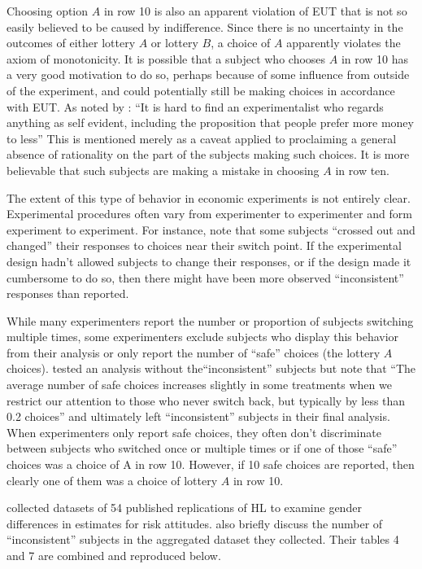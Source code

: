 \documentclass[../main.tex]{subfiles}
\begin{document}
Choosing option $A$ in row 10 is also an apparent violation of EUT that is not so easily believed to be caused by indifference.
Since there is no uncertainty in the outcomes of either lottery $A$ or lottery $B$, a choice of $A$ apparently violates the axiom of monotonicity.
It is possible that a subject who chooses $A$ in row 10 has a very good motivation to do so, perhaps because of some influence from outside of the experiment, and could potentially still be making choices in accordance with EUT.
As noted by \textcite[930]{Smith1982}: \enquote{It is hard to find an experimentalist who regards anything as self evident, including the proposition that people prefer more money to less}
This is mentioned merely as a caveat applied to proclaiming a general absence of rationality on the part of the subjects making such choices. 
It is more believable that such subjects are making a mistake in choosing $A$ in row ten.

The extent of this type of behavior in economic experiments is not entirely clear.
Experimental procedures often vary from experimenter to experimenter and form experiment to experiment.
For instance, \textcite{Holt2002} note that some subjects \enquote{crossed out and changed} their responses to choices near their switch point.
If the experimental design hadn't allowed subjects to change their responses, or if the design made it cumbersome to do so, then there might have been more observed \enquote{inconsistent} responses than reported. 

While many experimenters report the number or proportion of subjects switching multiple times, some experimenters exclude subjects who display this behavior from their analysis or only report the number of \enquote{safe} choices (the lottery $A$ choices).
\textcite[1648]{Holt2002} tested an analysis without the\enquote{inconsistent} subjects but note that \enquote{The average number of safe choices increases slightly in some treatments when we restrict our attention to those who never switch back, but typically by less than 0.2 choices} and ultimately left \enquote{inconsistent} subjects in their final analysis.
When experimenters only report safe choices, they often don't discriminate between subjects who switched once or multiple times or if one of those \enquote{safe} choices was a choice of A in row 10.
However, if 10 safe choices are reported, then clearly one of them was a choice of lottery $A$ in row 10.

\textcite[9]{Filippin2014} collected datasets of 54 published replications of HL to examine gender differences in estimates for risk attitudes.
\textcite[10-11, 17-18]{Filippin2014} also briefly discuss the number of \enquote{inconsistent} subjects in the aggregated dataset they collected.
Their tables 4 and 7 are combined and reproduced below.
\end{document}
